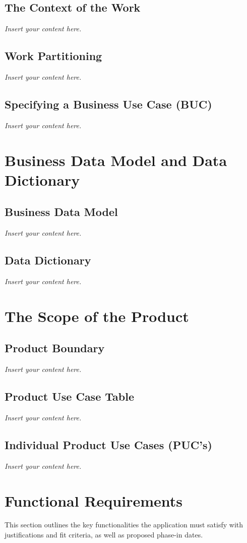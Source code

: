 \documentclass[12pt]{article}
\newcommand{\lips}{\textit{Insert your content here.}}
\begin{document}
\subsection{The Context of the Work}
\lips
\subsection{Work Partitioning}
\lips
\subsection{Specifying a Business Use Case (BUC)}
\lips

\section{Business Data Model and Data Dictionary}
\subsection{Business Data Model}
\lips
\subsection{Data Dictionary}
\lips

\section{The Scope of the Product}
\subsection{Product Boundary}
\lips
\subsection{Product Use Case Table}
\lips
\subsection{Individual Product Use Cases (PUC's)}
\lips

\section{Functional Requirements}
This section outlines the key functionalities the application must satisfy with justifications and fit criteria, as well as proposed phase-in dates.
\end{document}
